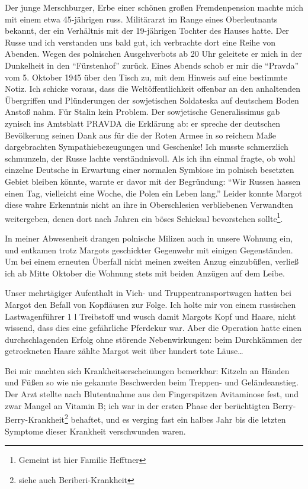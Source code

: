 Der junge Merschburger, Erbe einer schönen großen Fremdenpension machte mich mit einem etwa 45-jährigen russ. Militärarzt im Range eines Oberleutnants bekannt, der ein Verhältnis mit der 19-jährigen Tochter des Hauses hatte. Der Russe und ich verstanden uns bald gut, ich verbrachte dort eine Reihe von Abenden. Wegen des polnischen Ausgehverbots ab 20 Uhr geleitete er mich in der Dunkelheit in den \enquote{Fürstenhof} zurück. Eines Abends schob er mir die \enquote{Pravda} vom 5. Oktober 1945 über den Tisch zu, mit dem Hinweis auf eine bestimmte Notiz. Ich schicke voraus, dass die Weltöffentlichkeit offenbar an den anhaltenden Übergriffen und Plünderungen der sowjetischen Soldateska auf deutschem Boden Anstoß nahm. Für Stalin kein Problem. Der sowjetische Generalissimus gab zynisch ins Amtsblatt PRAVDA die Erklärung ab: er spreche der deutschen Bevölkerung  seinen Dank aus für die der Roten Armee in so reichem Maße dargebrachten Sympathiebezeugungen und Geschenke! Ich musste schmerzlich schmunzeln, der Russe lachte verständnisvoll. Als ich ihn einmal fragte, ob wohl einzelne Deutsche in Erwartung einer normalen Symbiose im polnisch besetzten Gebiet bleiben könnte, warnte er davor mit der Begründung: \enquote{Wir Russen hassen einen Tag, vielleicht eine Woche, die Polen ein Leben lang.} Leider konnte Margot diese wahre Erkenntnis nicht an ihre in Oberschlesien verbliebenen Verwandten weitergeben, denen dort nach Jahren ein böses Schicksal bevorstehen sollte\footnote{Gemeint ist hier Familie Hefftner}.

In meiner Abwesenheit drangen polnische Milizen auch in unsere Wohnung ein, und entkamen trotz Margots geschickter Gegenwehr mit einigen Gegenständen. Um bei einem erneuten Überfall nicht meinen zweiten Anzug einzubüßen, verließ ich ab Mitte Oktober die Wohnung stets mit beiden Anzügen auf dem Leibe.

Unser mehrtägiger Aufenthalt in Vieh- und Truppentransportwagen hatten bei Margot den Befall von Kopfläusen zur Folge. Ich holte mir von einem russischen Lastwagenführer 1 l Treibstoff und wusch damit Margots Kopf und Haare, nicht wissend, dass dies eine gefährliche Pferdekur war. Aber die Operation hatte einen durchschlagenden Erfolg ohne störende Nebenwirkungen: beim Durchkämmen der getrockneten Haare zählte Margot weit über hundert tote Läuse\dots

Bei mir machten sich Krankheitserscheinungen bemerkbar: Kitzeln an Händen  und Füßen so wie nie gekannte Beschwerden beim Treppen- und Geländeanstieg. Der Arzt stellte nach Blutentnahme aus den Fingerspitzen Avitaminose fest, und zwar Mangel an Vitamin B; ich war in der ersten Phase der berüchtigten Berry-Berry-Krankheit\footnote{siehe auch Beriberi-Krankheit} behaftet, und es verging fast ein halbes Jahr bis die letzten Symptome dieser Krankheit verschwunden waren.

